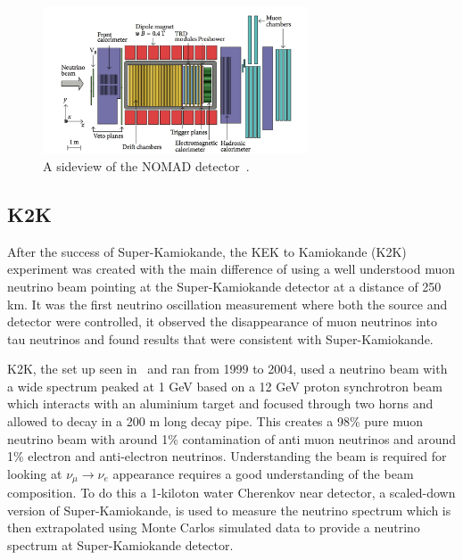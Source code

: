 \begin{figure}[h!]
\centering
  \centering
\includegraphics[width=0.7\textwidth]{figures/NOMAD2.jpeg}
\vspace{2mm}
\caption{A sideview of the NOMAD detector~\cite{69NOMAD}.}
\label{fig:NOMAD}
\end{figure}

\subsection{K2K}
After the success of Super-Kamiokande, the KEK to Kamiokande (K2K) experiment\cite{22K2K} was created with the main difference of using a well understood muon neutrino beam pointing at the Super-Kamiokande detector at a distance of 250 km. It was the first neutrino oscillation measurement where both the source and detector were controlled, it observed the disappearance of muon neutrinos into tau neutrinos and found results that were consistent with Super-Kamiokande.

K2K, the set up seen in~ and ran from 1999 to 2004, used a neutrino beam with a wide spectrum peaked at 1 GeV based on a 12 GeV proton synchrotron beam which interacts with an aluminium target and focused through two horns and allowed to decay in a 200 m long decay pipe. This creates a 98\% pure muon neutrino beam with around 1\% contamination of anti muon neutrinos and around 1\% electron and anti-electron neutrinos. Understanding the beam is required for looking at $\nu_\mu \rightarrow \nu_e$ appearance requires a good understanding of the beam composition. To do this a 1-kiloton water Cherenkov near detector,  a scaled-down version of Super-Kamiokande, is used to measure the neutrino spectrum which is then extrapolated using Monte Carlos simulated data to provide a neutrino spectrum at Super-Kamiokande detector.

